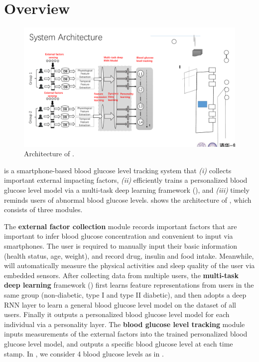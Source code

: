 
\section{Overview}
\label{sec:overview}

\begin{figure}[h]
  \centering
  \includegraphics[width=0.75\columnwidth]{./img/System_Arch.pdf}
  \caption{Architecture of \sysname. }
  \label{fig:architecture}
\end{figure}

\sysname is a smartphone-based blood glucose level tracking system that \emph{(i)} collects important external impacting factors, \emph{(ii)} efficiently trains a personalized blood glucose level model via a multi-task deep learning framework (\modelname), and \emph{(iii)} timely reminds users of abnormal blood glucose levels.
 shows the architecture of \sysname, which consists of three modules.

The \textbf{external factor collection} module records important factors that are important to infer blood glucose concentration and convenient to input via smartphones. 
The user is required to manually input their basic information (\eg health status, age, weight), and record drug, insulin and food intake.
Meanwhile, \sysname will automatically measure the physical activities and sleep quality of the user via embedded sensors.
After collecting data from multiple users, the \textbf{multi-task deep learning} framework (\modelname) first learns feature representations from users in the same group (non-diabetic, type I and type II diabetic), and then adopts a deep RNN layer to learn a general blood glucose level model on the dataset of all users. 
Finally it outputs a personalized blood glucose level model for each individual via a personality layer.
The \textbf{blood glucose level tracking} module inputs measurements of the external factors into the trained personalized blood glucose level model, and outputs a specific blood glucose level at each time stamp. 
In \sysname, we consider 4 blood glucose levels as in .

